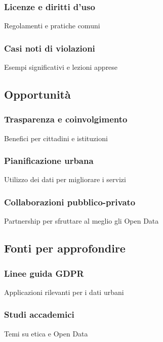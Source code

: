 \subsubsection{Licenze e diritti d'uso}
Regolamenti e pratiche comuni

\subsubsection{Casi noti di violazioni}
Esempi significativi e lezioni apprese

\subsection{Opportunità}
\subsubsection{Trasparenza e coinvolgimento}
Benefici per cittadini e istituzioni

\subsubsection{Pianificazione urbana}
Utilizzo dei dati per migliorare i servizi

\subsubsection{Collaborazioni pubblico-privato}
Partnership per sfruttare al meglio gli Open Data

\subsection{Fonti per approfondire}
\subsubsection{Linee guida GDPR}
Applicazioni rilevanti per i dati urbani

\subsubsection{Studi accademici}
Temi su etica e Open Data